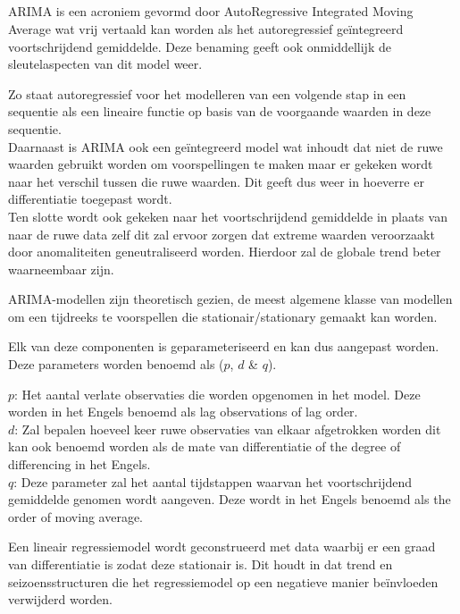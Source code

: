 \subsection{}

ARIMA is een acroniem gevormd door AutoRegressive Integrated Moving Average wat vrij vertaald kan worden als het autoregressief ge\"{i}ntegreerd voortschrijdend gemiddelde. Deze benaming geeft ook onmiddellijk de sleutelaspecten van dit model weer. 

Zo staat autoregressief voor het modelleren van een volgende stap in een sequentie als een lineaire functie op basis van de voorgaande waarden in deze sequentie.
\\Daarnaast is ARIMA ook een ge\"{i}ntegreerd model wat inhoudt dat niet de ruwe waarden gebruikt worden om voorspellingen te maken maar er gekeken wordt naar het verschil tussen die ruwe waarden. Dit geeft dus weer in hoeverre er differentiatie toegepast wordt.
\\Ten slotte wordt ook gekeken naar het voortschrijdend gemiddelde in plaats van naar de ruwe data zelf dit zal ervoor zorgen dat extreme waarden veroorzaakt door anomaliteiten geneutraliseerd worden. Hierdoor zal de globale trend beter waarneembaar zijn.

ARIMA-modellen zijn theoretisch gezien, de meest algemene klasse van modellen om een tijdreeks te voorspellen die stationair/stationary gemaakt kan worden. 

Elk van deze componenten is geparameteriseerd en kan dus aangepast worden. Deze parameters worden benoemd als ($p$, $d$ \& $q$).

$p$: Het aantal verlate observaties die worden opgenomen in het model. Deze worden in het Engels benoemd als lag observations of lag order.
\\$d$: Zal bepalen hoeveel keer ruwe observaties van elkaar afgetrokken worden dit kan ook benoemd worden als de mate van differentiatie of the degree of differencing in het Engels.
\\$q$: Deze parameter zal het aantal tijdstappen waarvan het voortschrijdend gemiddelde genomen wordt aangeven. Deze wordt in het Engels benoemd als the order of moving average. 

Een lineair regressiemodel wordt geconstrueerd met data waarbij er een graad van differentiatie is zodat deze stationair is. Dit houdt in dat trend en seizoensstructuren die het regressiemodel op een negatieve manier be\"{i}nvloeden verwijderd worden.

